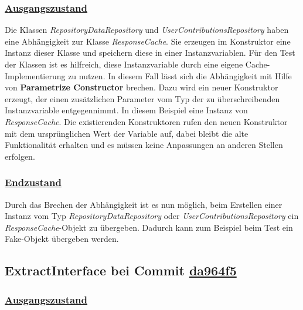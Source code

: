 \subsubsection*{\href{https://github.com/lukaspanni/OpenSourceStats/tree/3b1eb5bf6750c3ccaeb05962ec8a8ae743adbf2c/app/src/main/java/de/lukaspanni/opensourcestats/repository}{Ausgangszustand}}

Die Klassen \textit{RepositoryDataRepository} und \textit{UserContributionsRepository} haben eine Abhängigkeit zur Klasse \textit{ResponseCache}. 
Sie erzeugen im Konstruktor eine Instanz dieser Klasse und speichern diese in einer Instanzvariablen.
Für den Test der Klassen ist es hilfreich, diese Instanzvariable durch eine eigene Cache-Implementierung zu nutzen.
In diesem Fall lässt sich die Abhängigkeit mit Hilfe von \textbf{Parametrize Constructor} brechen.
\newline
Dazu wird ein neuer Konstruktor erzeugt, der einen zusätzlichen Parameter vom Typ der zu überschreibenden Instanzvariable entgegennimmt. In diesem Beispiel eine Instanz von \textit{ResponseCache}.
Die existierenden Konstruktoren rufen den neuen Konstruktor mit dem ursprünglichen Wert der Variable auf, dabei bleibt die alte Funktionalität erhalten und es müssen keine Anpassungen an anderen Stellen erfolgen.

\subsubsection*{\href{https://github.com/lukaspanni/OpenSourceStats/tree/d098b93ffd042cb095af679254ed01584417763e/app/src/main/java/de/lukaspanni/opensourcestats/repository}{Endzustand}}

Durch das Brechen der Abhängigkeit ist es nun möglich, beim Erstellen einer Instanz vom Typ \textit{RepositoryDataRepository} oder \textit{UserContributionsRepository} ein \textit{ResponseCache}-Objekt zu übergeben. Dadurch kann zum Beispiel beim Test ein Fake-Objekt übergeben werden.
\newpage


\subsection{ExtractInterface bei Commit \href{https://github.com/lukaspanni/OpenSourceStats/commit/da964f5d7e2485f28cf19b4ec178b92805538adc} {da964f5}}
\label{sec:ExtractInterface_AuthHandler_2}

\subsubsection*{\href{https://github.com/lukaspanni/OpenSourceStats/tree/473384cdb4bc8e9f8269af865cf210923c42b5c5/app/src/main/java/de/lukaspanni/opensourcestats/auth}{Ausgangszustand}}


